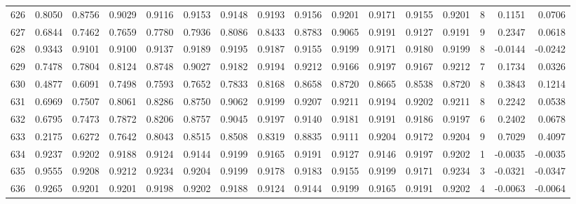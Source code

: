 \begin{tabular}{lrrrrrrrrrrrrrrr}
626 &      0.8050 &  0.8756 &  0.9029 &  0.9116 &  0.9153 &  0.9148 &  0.9193 &  0.9156 &  0.9201 &  0.9171 &   0.9155 &     0.9201 &      8 &                    0.1151 &                     0.0706 \\
627 &      0.6844 &  0.7462 &  0.7659 &  0.7780 &  0.7936 &  0.8086 &  0.8433 &  0.8783 &  0.9065 &  0.9191 &   0.9127 &     0.9191 &      9 &                    0.2347 &                     0.0618 \\
628 &      0.9343 &  0.9101 &  0.9100 &  0.9137 &  0.9189 &  0.9195 &  0.9187 &  0.9155 &  0.9199 &  0.9171 &   0.9180 &     0.9199 &      8 &                   -0.0144 &                    -0.0242 \\
629 &      0.7478 &  0.7804 &  0.8124 &  0.8748 &  0.9027 &  0.9182 &  0.9194 &  0.9212 &  0.9166 &  0.9197 &   0.9167 &     0.9212 &      7 &                    0.1734 &                     0.0326 \\
630 &      0.4877 &  0.6091 &  0.7498 &  0.7593 &  0.7652 &  0.7833 &  0.8168 &  0.8658 &  0.8720 &  0.8665 &   0.8538 &     0.8720 &      8 &                    0.3843 &                     0.1214 \\
631 &      0.6969 &  0.7507 &  0.8061 &  0.8286 &  0.8750 &  0.9062 &  0.9199 &  0.9207 &  0.9211 &  0.9194 &   0.9202 &     0.9211 &      8 &                    0.2242 &                     0.0538 \\
632 &      0.6795 &  0.7473 &  0.7872 &  0.8206 &  0.8757 &  0.9045 &  0.9197 &  0.9140 &  0.9181 &  0.9191 &   0.9186 &     0.9197 &      6 &                    0.2402 &                     0.0678 \\
633 &      0.2175 &  0.6272 &  0.7642 &  0.8043 &  0.8515 &  0.8508 &  0.8319 &  0.8835 &  0.9111 &  0.9204 &   0.9172 &     0.9204 &      9 &                    0.7029 &                     0.4097 \\
634 &      0.9237 &  0.9202 &  0.9188 &  0.9124 &  0.9144 &  0.9199 &  0.9165 &  0.9191 &  0.9127 &  0.9146 &   0.9197 &     0.9202 &      1 &                   -0.0035 &                    -0.0035 \\
635 &      0.9555 &  0.9208 &  0.9212 &  0.9234 &  0.9204 &  0.9199 &  0.9178 &  0.9183 &  0.9155 &  0.9199 &   0.9171 &     0.9234 &      3 &                   -0.0321 &                    -0.0347 \\
636 &      0.9265 &  0.9201 &  0.9201 &  0.9198 &  0.9202 &  0.9188 &  0.9124 &  0.9144 &  0.9199 &  0.9165 &   0.9191 &     0.9202 &      4 &                   -0.0063 &                    -0.0064 \\

\end{tabular}
